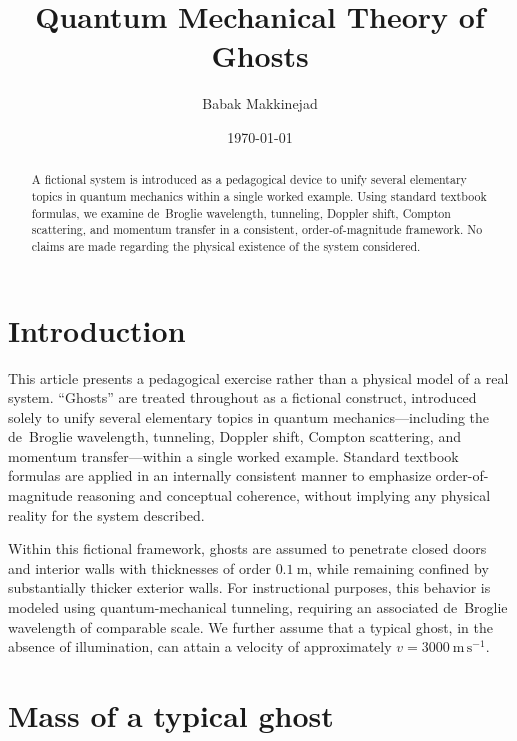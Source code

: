 \documentclass[aps,prper,twocolumn,superscriptaddress]{revtex4-2}
\begin{document}

\title{Quantum Mechanical Theory of Ghosts}
\author{Babak Makkinejad}

\date{\today}

\begin{abstract}
A fictional system is introduced as a pedagogical device to unify several elementary topics in quantum mechanics within a single worked example. Using standard textbook formulas, we examine de~Broglie wavelength, tunneling, Doppler shift, Compton scattering, and momentum transfer in a consistent, order-of-magnitude framework. No claims are made regarding the physical existence of the system considered.
\end{abstract}

\maketitle

\section{Introduction}

This article presents a pedagogical exercise rather than a physical model of a real system. ``Ghosts'' are treated throughout as a fictional construct, introduced solely to unify several elementary topics in quantum mechanics—including the de~Broglie wavelength, tunneling, Doppler shift, Compton scattering, and momentum transfer—within a single worked example. Standard textbook formulas are applied in an internally consistent manner to emphasize order-of-magnitude reasoning and conceptual coherence, without implying any physical reality for the system described.

Within this fictional framework, ghosts are assumed to penetrate closed doors and interior walls with thicknesses of order $0.1~\mathrm{m}$, while remaining confined by substantially thicker exterior walls. For instructional purposes, this behavior is modeled using quantum-mechanical tunneling,\cite{GriffithsQM} requiring an associated de~Broglie wavelength of comparable scale. We further assume that a typical ghost, in the absence of illumination, can attain a velocity of approximately $v = 3000~\mathrm{m\,s^{-1}}$.

\section{Mass of a typical ghost}
\end{document}
